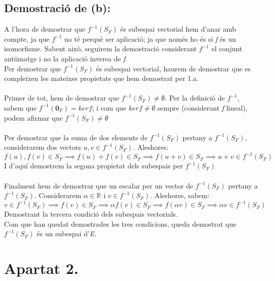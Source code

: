 \documentclass[a4paper, 11pt]{article}
\begin{document}
        \subsection*{Demostraci\'o de (b):}
            A l'hora de demostrar que ${f^{-1}(S_F)}$ \'es subespai vectorial hem d'anar amb compte, ja que ${f^{-1}}$ no t\'e perqu\`e ser aplicaci\'o; ja que nom\'es ho \'es si \emph{f} \'es un isomorfisme. Sabent aix\`o, seguirem la demostraci\'o considerant ${f^{-1}}$ el conjunt antiimatge i no la aplicaci\'o inversa de \emph{f}.\\
            Per demostrar que ${f^{-1}(S_F)}$ \'es subespai vectorial, haurem de demostrar que es compleixen les mateixes propietats que hem demostrat per 1.a.\\\\
            Primer de tot, hem de demostrar que ${f^{-1}(S_F) \neq \emptyset}$. Per la definici\'o de ${f^{-1}}$, sabem que ${f^{-1}(\mathbf{0}_F) = ker f}$; i com que ${ker f \neq \emptyset}$ sempre (considerant \emph{f} lineal), podem afirmar que ${f^{-1}(S_F) \neq \emptyset}$\\\\
            Per demostrar que la suma de dos elements de ${f^{-1}(S_F)}$ pertany a ${f^{-1}(S_F)}$, considerarem dos vectors ${u, v \in f^{-1}(S_F)}$. Aleshores:
            \begin{equation*}
                f(u),f(v) \in S_F \implies f(u) + f(v) \in S_F \implies f(u+v) \in S_F \implies u+v \in f^{-1}(S_F)
            \end{equation*}
            I d'aqu\'i demostrem la segona propietat dels subespais per ${f^{-1}(S_F)}$\\\\
            Finalment hem de demostrar que un escalar per un vector de ${f^{-1}(S_F)}$ pertany a ${f^{-1}(S_F)}$. Considerarem ${\alpha \in \mathbb{R} \text{ i } v\in f^{-1}(S_F)}$. Aleshores, sabem:
            \begin{equation*}
                v \in f^{-1}(S_F) \implies f(v) \in S_F \implies \alpha f(v) \in S_F \implies f(\alpha v) \in S_F \implies \alpha v \in f^{-1}(S_F)
            \end{equation*}
            Demostrant la tercera condici\'o dels subespais vectorials.\\
            Com que han quedat demostrades les tres condicions, queda demostrat que ${f^{-1}(S_F)}$ \'es un subespai d'\emph{E}.

    \section*{Apartat 2.}
\end{document}
